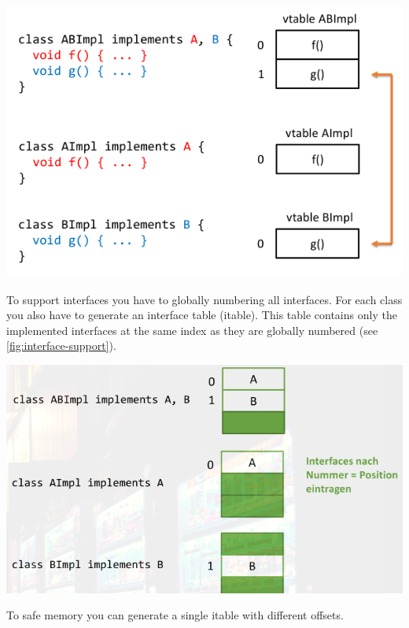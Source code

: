 \documentclass[12pt,twoside,landscape]{extarticle}
\begin{document}
\begin{multicols}{4}
{
\begin{center}
\includegraphics[width=.9\linewidth]{img/interface_bad_attempt.png}
\end{center}
\label{fig:bad-interface-implementation-attempt}
}

To support interfaces you have to globally numbering all interfaces.
For each class you also have to generate an interface table (itable).
This table contains only the implemented interfaces at the same index as they are globally numbered (see \autoref{fig:interface-support}).

{
\begin{center}
\includegraphics[width=.9\linewidth]{img/interface_support_2.png}
\end{center}
\label{fig:interface-support}
}

To safe memory you can generate a single itable with different offsets.


\end{multicols}
\end{document}

